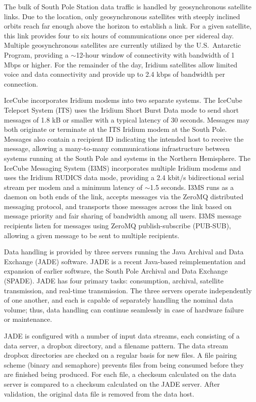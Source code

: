 The bulk of South Pole Station data traffic is handled by geosynchronous
satellite links.  Due to the location, only
geosynchronous satellites with steeply inclined orbits reach far enough
above the horizon to establish a link.  For a given satellite, this link
provides four to six hours of communications once per sidereal day.
Multiple geosynchronous satellites are currently utilized by the
U.S.~Antarctic Program, providing a $\sim$12-hour window of connectivity with
bandwidth of 1 Mbps or higher.  For the remainder of the day, Iridium
satellites allow limited voice and data connectivity and provide up to 2.4
kbps of bandwidth per connection.

IceCube incorporates Iridium modems into two separate systems.  The IceCube
Teleport System (ITS) uses the Iridium Short Burst Data mode to send short
messages of 1.8 kB or smaller with a typical latency of 30 seconds.
Messages may both originate or terminate at the ITS Iridium modem at the
South Pole.  Messages also contain a recipient ID indicating the intended
host to receive the message, allowing a many-to-many communications
infrastructure between systems running at the South Pole and systems in the
Northern Hemisphere.  The IceCube Messaging System (I3MS) incorporates
multiple Iridium modems and uses the Iridium RUDICS data mode, providing a
2.4 kbit/s bidirectional serial stream per modem and a minimum latency of
$\sim$1.5 seconds.  I3MS runs as a daemon on both ends of the link, accepts
messages via the ZeroMQ distributed messaging protocol, and transports
those messages across the link based on message priority and fair sharing
of bandwidth among all users. I3MS message recipients listen for messages
using ZeroMQ publish-subscribe (PUB-SUB), allowing a given message to be
sent to multiple recipients.

Data handling is provided by three servers running the Java Archival and
Data Exchange (JADE) software. JADE is a
recent Java-based reimplementation and expansion of earlier software, the
South Pole Archival and Data Exchange (SPADE).  JADE has 
four primary tasks: consumption, archival, satellite transmission, and
real-time transmission. The three servers operate independently of one
another, and each is capable of separately handling the nominal
data volume; thus, data handling can continue seamlessly in case of
hardware failure or maintenance. 

JADE is configured with a number of input data streams, 
each consisting of a data server, a dropbox directory, and a filename pattern.  The
data stream dropbox directories are checked on a regular basis for new
files. A file pairing scheme (binary and semaphore) prevents files from
being consumed before they are finished being produced. For each file, a
checksum calculated on the data server is compared to a checksum calculated
on the JADE server.  After validation, the original data file is removed
from the data host. 

